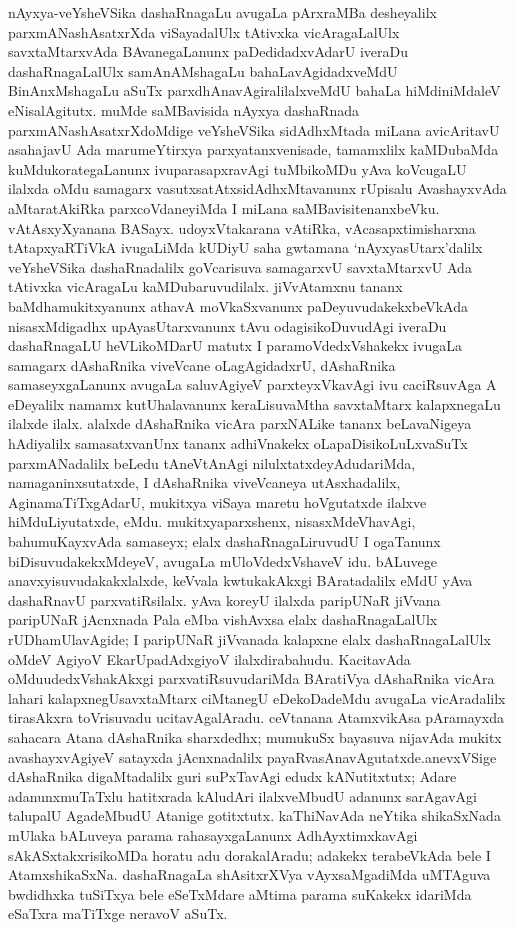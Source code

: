 nAyxya-veYsheVSika dashaRnagaLu avugaLa pArxraMBa desheyalilx parxmANashAsatxrXda viSaya\-dalUlx tAtivxka vicAragaLalUlx savxtaMtarxvAda BAvanegaLanunx paDedidadxvAdarU ive\-raDu dashaRnagaLalUlx samAnAMshagaLu bahaLavAgidadxveMdU BinAnxMshagaLu aSuTx parxdhAna\-vAgi\-ralilalxveMdU bahaLa hiMdiniMdaleV eNisalAgitutx. muMde saMBavi\-sida nAyxya dashaR\-nada parxmANashAsatxrXdoMdige veYsheVSika sidAdhxMtada miLana avicA\-ritavU asahajavU Ada marumeYtirxya parxyatanxvenisade, tamamxlilx kaMDubaMda kuMdukorategaLanunx ivu\break para\-sapxravAgi tuMbikoMDu yAva koVcugaLU ilalxda oMdu samagarx vasutxsatAtx\break sidAdhxMta\-vanunx rUpisalu AvashayxvAda aMtaratAkiRka parxcoVdaneyiMda I miLana saMBavisi\-tenanxbeVku. vAtAsxyXyanana BASayx. udoyxVtakarana vAtiRka, vAcasapxtimisharxna tAtapxyaR\-TiVkA ivugaLiMda kUDiyU saha gwtamana `nAyxyasUtarx'dalilx veYsheVSika dashaRnadalilx goVcarisuva samagarxvU savxtaMtarxvU Ada tAtivxka vicAragaLu kaMDubaruvu\-dilalx. jiVvAtamxnu tananx baMdhamukitxyanunx athavA moVkaSxvanunx paDeyuvudakekx\break beVkAda nisasxMdigadhx upAyasUtarxvanunx tAvu odagisikoDuvudAgi iveraDu dashaRna\-gaLU heVLikoMDarU matutx I paramoV\-dedxVshakekx ivugaLa samagarx dAshaRnika viveV\-cane oLagAgidadxrU, dAshaRnika samaseyxgaLanunx avu\-gaLa saluvAgiyeV parxteyxVkavAgi ivu caciRsuvAga A eDeyalilx namamx kutUhala\-vanunx keraLi\-suvaMtha savxtaMtarx kalapxnegaLu ilalxde ilalx. alalxde dAshaRnika vicAra parxNA\-Like tananx beLavaNigeya hAdiyalilx samasatx\-vanUnx tananx adhiVnakekx oLapaDisikoLuLxvaSuTx parxmANa\-dalilx beLedu tAneVtAnAgi nilulxtatxdeyAdudariMda, namaganinxsutatxde, I dAshaRnika viveVcaneya utAsxhadalilx, AginamaTiTxgAdarU, mukitxya viSaya maretu hoVgutatxde ilalxve hiMduLiyutatxde, eMdu. mukitxya\break parxshenx, nisasxMdeVhavAgi, bahumuKayxvAda samaseyx; elalx dashaRnagaLiruvudU I oga\-Tanunx biDisuvudakekxMdeyeV, avugaLa mUloV\-dedxVshaveV idu. bALuvege anavxyisu\-vudakakxlalxde, keVvala kwtukakAkxgi BAratadalilx eMdU yAva dashaRnavU parxvatiRsilalx. yAva koreyU ilalxda paripUNaR jiVvana paripUNaR jAcnxnada Pala eMba vishAvxsa elalx dashaRnagaLalUlx rUDhamUlavAgide; I paripUNaR jiVvanada kalapxne elalx dashaRna\-gaLalUlx oMdeV AgiyoV EkarUpadAdxgiyoV ilalxdira\-bahudu. KacitavAda oMdu\break udedxVshakAkxgi parxvatiRsuvudariMda BAratiVya dAshaRnika vicAra lahari kalapxnegU\break savxtaMtarx ciMtanegU eDekoDadeMdu avugaLa vicAradalilx tira\-sAkxra toVrisuvadu ucita\-vAgalAradu. ceVtanana AtamxvikAsa pAramayxda sahacara Atana dAshaRnika sharxdedhx; mumukuSx bayasuva nijavAda mukitx avashayxvAgiyeV satayxda jAcnxna\-dalilx payaRvasAnavAgutatxde.\break anevxVSige dAshaRnika digaMtadalilx guri suPxTavAgi edudx kANutitxtutx; Adare adanunx\break \hbox{muTaTxlu} hatitxrada kAludAri ilalxveMbudU adanunx sarAga\-vAgi talupalU Aga\break\-deMbudU Atanige gotitxtutx. kaThiNavAda neYtika shikaSxNada \hbox{mUlaka} bALuveya parama rahasayxgaLanunx AdhAyxtimxkavAgi sAkASxtakxrisikoMDa horatu adu doraka\-lAradu; adakekx terabeVkAda bele I AtamxshikaSxNa. dashaRnagaLa shAsitxrXVya vAyxsaMga\-diMda uMTAguva \hbox{bwdidhxka} tuSiTxya bele eSeTxMdare aMtima parama suKakekx idariMda eSaTxra maTiTxge \hbox{neravoV} aSuTx.

